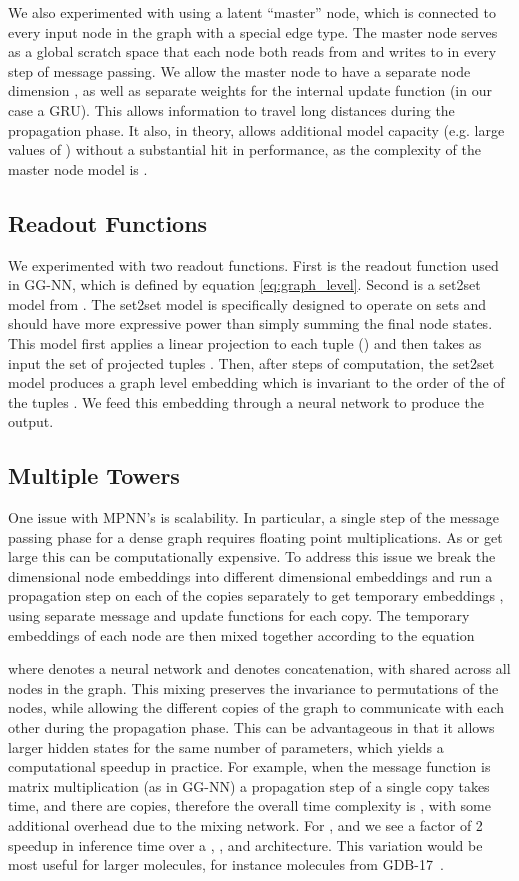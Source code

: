 \documentclass{article}
\begin{document}
  We also experimented with using a latent ``master'' node, which is connected to every input node in the graph with a special edge type. The master node serves as a global scratch space that each node both reads from and writes to in every step of message passing. We allow the master node to have a separate node dimension , as well as separate weights for the internal update function (in our case a GRU). This allows information to travel long distances during the propagation phase. It also, in theory, allows additional model capacity (e.g. large values of ) without a substantial hit in performance, as the complexity of the master node model is . 

\subsection{Readout Functions}
   We experimented with two readout functions. First is the readout function used in GG-NN, which is defined by equation \ref{eq:graph_level}. Second is a set2set model from \citet{vinyals}. The set2set model is specifically designed to operate on sets and should have more expressive power than simply summing the final node states. This model first applies a linear projection to each tuple () and then takes as input the set of projected tuples . Then, after  steps of computation, the set2set model produces a graph level embedding  which is invariant to the order of the of the tuples . We feed this embedding  through a neural network to produce the output. 

\subsection{Multiple Towers} \label{subsec:towers}
   One issue with MPNN’s is scalability. In particular, a single step of the message passing phase for a dense graph requires  floating point multiplications. As  or  get large this can be computationally expensive. To address this issue we break the  dimensional node embeddings  into  different  dimensional embeddings  and run a propagation step on each of the  copies separately to get temporary embeddings , using separate message and update functions for each copy. The  temporary embeddings of each node are then mixed together according to the equation
 
 where  denotes a neural network and  denotes concatenation, with  shared across all nodes in the graph. This mixing preserves the invariance to permutations of the nodes, while allowing the different copies of the graph to communicate with each other during the propagation phase. This can be advantageous in that it allows larger hidden states for the same number of parameters, which yields a computational speedup in practice. For example, when the message function is matrix multiplication (as in GG-NN) a propagation step of a single copy takes  time, and there are  copies, therefore the overall time complexity is , with some additional overhead due to the mixing network. For ,  and  we see a factor of 2 speedup in inference time over a , , and  architecture. This variation would be most useful for larger molecules, for instance molecules from GDB-17~\citep{ruddigkeit2012enumeration}.
   
\end{document}
